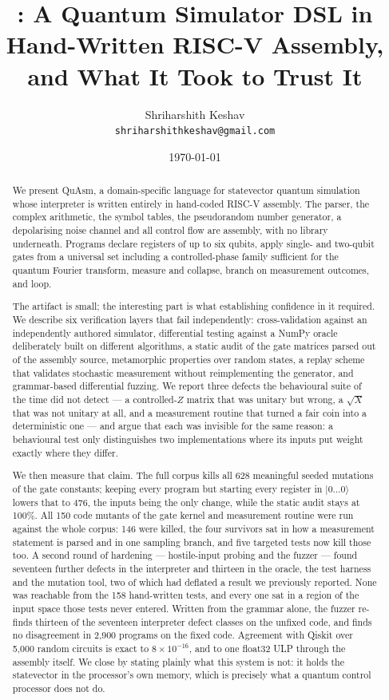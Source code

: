 \documentclass[11pt]{article}
\title{\quasm{}: A Quantum Simulator DSL in Hand-Written RISC-V Assembly,\\
       and What It Took to Trust It}
\author{Shriharshith Keshav\\
  \small\texttt{shriharshithkeshav@gmail.com}}
\date{\today}
\newcommand{\quasm}{QuAsm}
\newcommand{\ket}[1]{\ensuremath{|#1\rangle}}
\begin{document}
\maketitle

\begin{abstract}
We present \quasm{}, a domain-specific language for statevector quantum simulation whose
interpreter is written entirely in hand-coded RISC-V assembly. The parser, the complex
arithmetic, the symbol tables, the pseudorandom number generator, a depolarising noise
channel and all control flow are assembly, with no library underneath. Programs declare
registers of up to six qubits, apply single- and two-qubit gates from a universal set
including a controlled-phase family sufficient for the quantum Fourier transform, measure
and collapse, branch on measurement outcomes, and loop.

The artifact is small; the interesting part is what establishing confidence in it required.
We describe six verification layers that fail independently: cross-validation against an
independently authored simulator, differential testing against a NumPy oracle deliberately
built on different algorithms, a static audit of the gate matrices parsed out of the
assembly source, metamorphic properties over random states, a replay scheme that validates
stochastic measurement without reimplementing the generator, and grammar-based differential
fuzzing. We report three defects the behavioural suite of the time did not detect --- a
controlled-$Z$ matrix that was unitary but wrong, a $\sqrt{X}$ that was not unitary at all,
and a measurement routine that turned a fair coin into a deterministic one --- and argue
that each was invisible for the same reason: a behavioural test only distinguishes two
implementations where its inputs put weight exactly where they differ.

We then measure that claim. The full corpus kills all 628 meaningful seeded
mutations of the gate constants; keeping every program but starting every register in
\ket{0\ldots0} lowers that to 476, the inputs being the only change, while the
static audit stays at 100\%. All 150 code mutants of the gate kernel and measurement routine were run against the whole corpus: 146 were killed, the four survivors sat in how a measurement statement is parsed and in one sampling branch, and five targeted tests now kill those too. A second round of hardening --- hostile-input
probing and the fuzzer --- found seventeen further defects in the interpreter and thirteen in
the oracle, the test harness and the mutation tool, two of which had deflated a result we
previously reported. None was reachable from the 158 hand-written tests, and every one sat
in a region of the input space those tests never entered. Written from the grammar alone,
the fuzzer re-finds thirteen of the seventeen interpreter defect classes on the unfixed
code, and finds no disagreement in 2{,}900 programs on the fixed code. Agreement
with Qiskit over 5{,}000 random circuits is exact to $8 \times 10^{-16}$, and to one float32
ULP through the assembly itself. We close by stating plainly what this system is not: it
holds the statevector in the processor's own memory, which is precisely what a quantum
control processor does not do.
\end{abstract}
\end{document}
